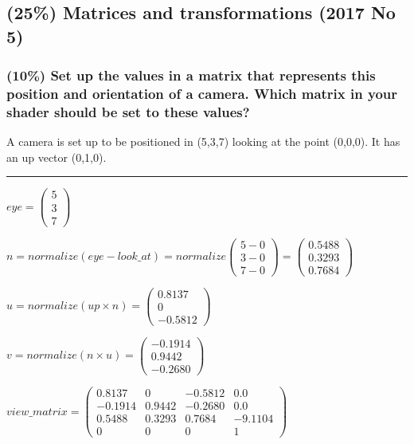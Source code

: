 \subsection{(25\%) Matrices and transformations (2017 No 5)}

\subsubsection{(10\%) Set up the values in a matrix that represents this position and orientation of a camera. Which matrix in your shader should be set to these values?}

A camera is set up to be positioned in (5,3,7)
looking at the point (0,0,0).
It has an up vector (0,1,0).

\rule{\textwidth}{0.1mm}

$ 
    eye
    =
    \left(\begin{array}{c}
        5\\
        3\\
        7
    \end{array}\right)
$

$
    n
=
    normalize(eye - look\_at)
=
    normalize\left(\begin{array}{c}
        5 - 0\\
        3 - 0\\
        7 - 0
    \end{array}\right)
=
    \left(\begin{array}{c}
        0.5488\\
        0.3293\\
        0.7684
    \end{array}\right)
$

$
    u
=
    normalize\left(up \times n\right)
=
    \left(\begin{array}{c}
        0.8137\\
        0\\
        -0.5812
    \end{array}\right)
$

$
    v
=
    normalize\left(n \times u\right)
=
    \left(\begin{array}{c}
        -0.1914\\
        0.9442\\
        -0.2680
    \end{array}\right)
$

$
    view\_matrix
=
    \left(\begin{array}{cccc}
         0.8137 & 0      & -0.5812 &  0.0 \\
        -0.1914 & 0.9442 & -0.2680 &  0.0 \\
         0.5488 & 0.3293 &  0.7684 & -9.1104 \\
         0 & 0 & 0 & 1
    \end{array}\right)
$

